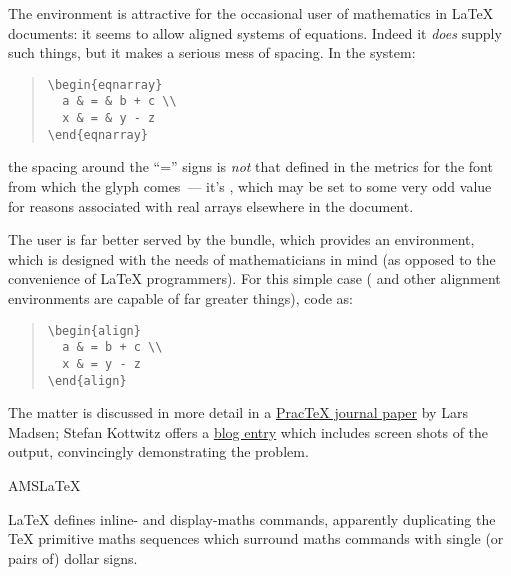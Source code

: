 
The environment  is attractive for the
occasional user of mathematics in \LaTeX{} documents: it seems to
allow aligned systems of equations.  Indeed it \emph{does} supply such
things, but it makes a serious mess of spacing.  In the system:
\begin{quote}
\begin{verbatim}
\begin{eqnarray}
  a & = & b + c \\
  x & = & y - z
\end{eqnarray}
\end{verbatim}
\end{quote}
the spacing around the ``='' signs is \emph{not} that defined in the
metrics for the font from which the glyph comes~--- it's
, which may be set to some very odd value for reasons
associated with real arrays elsewhere in the document.

The user is far better served by the \AMSLaTeX{} bundle, which
provides an  environment, which is designed with
the needs of mathematicians in mind (as opposed to the convenience of
\LaTeX{} programmers).  For this simple case ( and
other \AMSLaTeX{} alignment environments are capable of far greater
things), code as:
\begin{quote}
\begin{verbatim}
\begin{align}
  a & = b + c \\
  x & = y - z
\end{align}
\end{verbatim}
\end{quote}
The matter is discussed in more detail in a %
\href{http://tug.org/pracjourn/2006-4/madsen/madsen.pdf}{Prac\TeX{} journal paper}
by Lars Madsen; Stefan Kottwitz offers a %
\href{http://texblog.net/latex-archive/maths/eqnarray-align-environment/}{\tex{} blog entry}
which includes screen shots of the output, convincingly demonstrating
the problem.
\begin{ctanrefs}
\item[AMSLaTeX]
\end{ctanrefs}


\LaTeX{} defines inline- and display-maths commands, apparently
duplicating the \TeX{} primitive maths sequences which surround maths
commands with single (or pairs of) dollar signs.

